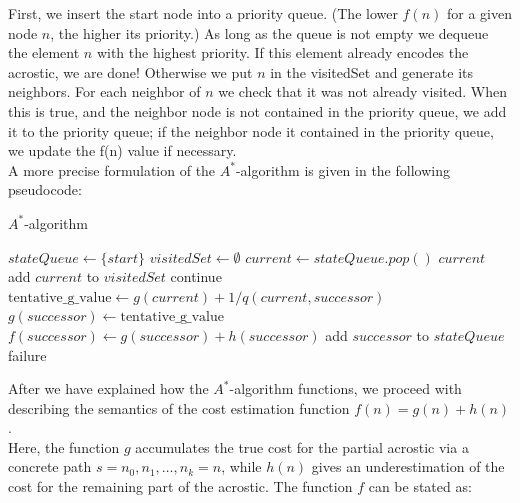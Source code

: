 \documentclass[11pt]{reportAlternative}
\begin{document}
First, we insert the start node into a priority queue. (The lower $f(n)$ for a given node $n$, the higher its priority.) As long as the queue is not empty we dequeue the element $n$ with the highest priority. If this element already encodes the acrostic, we are done! Otherwise we put $n$ in the
visitedSet and generate its neighbors. For each neighbor of $n$ we check that it was not already visited. When this is true, and the neighbor node is not contained in the priority queue, we add it to the priority queue; if the neighbor node it contained in the priority queue, we update the f(n) value if necessary.\\

A more precise formulation of the $A^*$-algorithm is given in the following pseudocode:\\

\newpage
\begin{algorithm}
\caption{$A^*$-algorithm}\label{AstarAlgo}
\begin{algorithmic}[1]
\State $stateQueue\gets \{start\}$
\State $visitedSet\gets \emptyset$
\State $current\gets stateQueue.pop()$
\State \Return $current$ 
\EndIf
\State add $current$ to $visitedSet$
			 \State continue
		\EndIf		
		\State
		\State $\textrm{tentative\_g\_value} \gets g(current) + 1/q(current,successor)$		
		\State
			\State $g(successor)\gets \mathrm{tentative\_g\_value}$
			\State $f(successor)\gets g(successor) + h(successor)$
				\State add $successor$ to $stateQueue$
			\EndIf
		\EndIf
	\EndFor			
\EndWhile			 
\Return failure
\EndFunction
\end{algorithmic}
\end{algorithm}


After we have explained how the $A^*$-algorithm functions, we proceed with describing the semantics of the cost estimation function $f(n)=g(n) + h(n)$.\\
Here, the function $g$ accumulates the true cost for the partial acrostic via a concrete path $s=n_0,n_1,\dots,n_k=n$, while $h(n)$ gives an underestimation of the cost for the remaining part of the acrostic. The function $f$ can be stated as:
  
\end{document}
